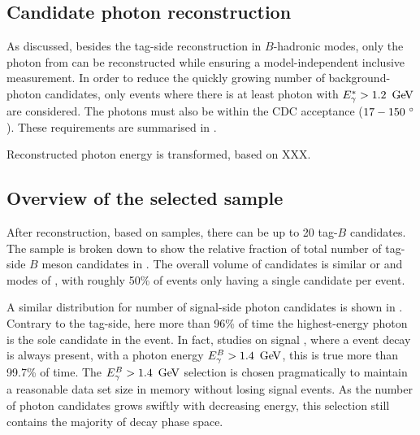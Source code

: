 \subsection{Candidate photon reconstruction}\label{sec:gamma_reconstruction}

As discussed, besides the tag-side reconstruction in $B$-hadronic modes, only the photon from \BtoXsgamma can be reconstructed while ensuring a model-independent inclusive measurement.
In order to reduce the quickly growing number of background-photon candidates, only events where there is at least photon with ${E^*_{\gamma}}>1.2~\mathrm{\,Ge\kern -0.1em V}$ are considered.
The photons must also be within the CDC acceptance ($17-150~^{\circ}$).
These requirements are summarised in .
\begin{table}[htbp!]
    \centering
     \caption{\label{tab:photon_requirements} Requirements for photons in reconstructed events.}
\end{table}

Reconstructed photon energy is transformed, based on XXX.

\subsection{Overview of the selected sample}\label{sec:reconstruction_overview}

After reconstruction, based on \MC samples, there can be up to 20 tag-$B$ candidates.
The sample is broken down to show the relative fraction of total number of tag-side $B$ meson candidates in .
The overall volume of candidates is similar or \Bp and \Bz modes of \FEI, with roughly 50\% of events only having a single candidate per event.

A similar distribution for number of signal-side photon candidates is shown in .
Contrary to the tag-side, here more than 96\% of time the highest-energy photon is the sole candidate in the event.
In fact, studies on signal \MC, where a \BtoXsgamma event decay is always present, with a photon energy ${E^B_{\gamma}}>1.4~\mathrm{\,Ge\kern -0.1em V}$, this is true more than  99.7\% of time.
The ${E^B_{\gamma}}>1.4~\mathrm{\,Ge\kern -0.1em V}$ selection is chosen pragmatically to maintain a reasonable data set size in memory without losing signal events.
As the number of photon candidates grows swiftly with decreasing energy, this selection still contains the majority of \BtoXsgamma decay phase space.

